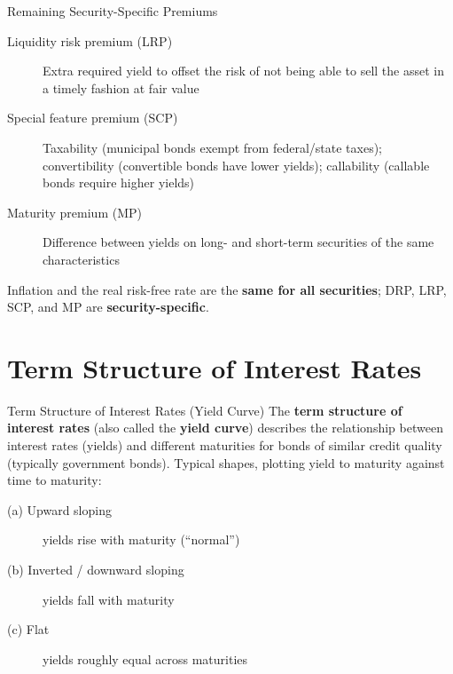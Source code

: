 \documentclass[aspectratio=169]{beamer}
\begin{document}
\begin{frame}{Remaining Security-Specific Premiums}
\begin{description}
  \item[Liquidity risk premium (LRP)] Extra required yield to offset the risk of not being able to sell the asset in a timely fashion at fair value
  \item[Special feature premium (SCP)] Taxability (municipal bonds exempt from federal/state taxes); convertibility (convertible bonds have lower yields); callability (callable bonds require higher yields)
  \item[Maturity premium (MP)] Difference between yields on long- and short-term securities of the same characteristics
\end{description}
\vspace{0.3em}
Inflation and the real risk-free rate are the \textbf{same for all securities}; DRP, LRP, SCP, and MP are \textbf{security-specific}.
\end{frame}


\section{Term Structure of Interest Rates}

\begin{frame}{Term Structure of Interest Rates (Yield Curve)}
The \textbf{term structure of interest rates} (also called the \textbf{yield curve}) describes the relationship between interest rates (yields) and different maturities for bonds of similar credit quality (typically government bonds).
\vspace{0.4em}
Typical shapes, plotting yield to maturity against time to maturity:
\begin{description}
  \item[(a) Upward sloping] yields rise with maturity (``normal'')
  \item[(b) Inverted / downward sloping] yields fall with maturity
  \item[(c) Flat] yields roughly equal across maturities
\end{description}
\end{frame}
\end{document}
